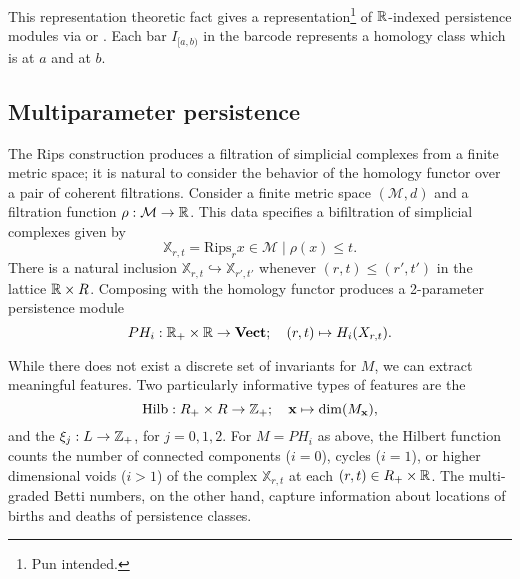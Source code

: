 \documentclass{article}
\begin{document}
This representation theoretic fact gives a representation\footnote{Pun intended.} of
$\mathbb{R}$-indexed persistence modules via  or
. Each bar $I_{[a,b)}$ in the barcode represents
a homology class which is  at $a$ and  at $b$.

\subsection{Multiparameter persistence}
The Rips construction produces a filtration of simplicial complexes from a
finite metric space; it is natural to consider the behavior of the homology
functor over a pair of coherent filtrations. Consider
a finite metric space $(\mathcal M, d)$ and a filtration
function $\rho:\mathcal M \to \mathbb{R}$. This data specifies a bifiltration of
simplicial complexes given by
\[\mathbb{X}_{r,t} = \text{Rips}_r{x \in \mathcal M \mid \rho(x) \leq t}.\]
There is a natural inclusion $\mathbb{X}_{r,t} \hookrightarrow
\mathbb{X}_{r',t'}$ whenever $(r,t) \leq (r',t')$ in the lattice $\mathbb{R} \times R$.
Composing with the homology functor produces a 2-parameter persistence module
\[PH_{i}: \mathbb{R}_+ \times \mathbb{R} \to \operatorname{\mathbf{Vect}}; \quad (r,t) \mapsto H_i(X_{r,t}).\]



While there does not exist a discrete set of invariants for $M$, we can extract
meaningful features. Two particularly informative types of features are 
 the 
  \[\text{Hilb}: R_+ \times R \to \mathbb{Z}_+;\quad \mathbf{x} \mapsto \dim(M_\mathbf{x}),\] and
the  $\xi_j: L \to \mathbb{Z}_+$, for $j =
0,1,2$. For $M = PH_i$ as above, the Hilbert function counts the number of
connected components ($i=0$), cycles ($i=1$), or higher dimensional voids ($i >
1$) of the complex $\mathbb{X}_{r,t}$ at each $(r,t) \in R_+\times \mathbb{R}$. The multi-graded
Betti numbers, on the other hand, capture information about locations of births
and deaths of persistence classes.
\end{document}

